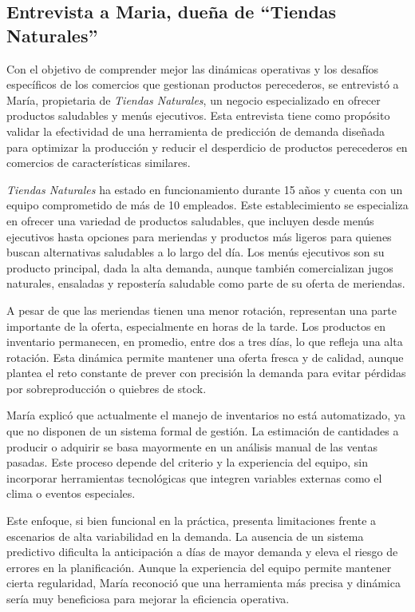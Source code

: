 \subsection{Entrevista a Maria, dueña de ``Tiendas Naturales''}

Con el objetivo de comprender mejor las dinámicas operativas y los desafíos específicos de los comercios que gestionan productos perecederos, se entrevistó a María, propietaria de \textit{Tiendas Naturales}, un negocio especializado en ofrecer productos saludables y menús ejecutivos. Esta entrevista tiene como propósito validar la efectividad de una herramienta de predicción de demanda diseñada para optimizar la producción y reducir el desperdicio de productos perecederos en comercios de características similares.

\indent \textit{Tiendas Naturales} ha estado en funcionamiento durante 15 años y cuenta con un equipo comprometido de más de 10 empleados. Este establecimiento se especializa en ofrecer una variedad de productos saludables, que incluyen desde menús ejecutivos hasta opciones para meriendas y productos más ligeros para quienes buscan alternativas saludables a lo largo del día. Los menús ejecutivos son su producto principal, dada la alta demanda, aunque también comercializan jugos naturales, ensaladas y repostería saludable como parte de su oferta de meriendas.

\indent A pesar de que las meriendas tienen una menor rotación, representan una parte importante de la oferta, especialmente en horas de la tarde. Los productos en inventario permanecen, en promedio, entre dos a tres días, lo que refleja una alta rotación. Esta dinámica permite mantener una oferta fresca y de calidad, aunque plantea el reto constante de prever con precisión la demanda para evitar pérdidas por sobreproducción o quiebres de stock.

\indent María explicó que actualmente el manejo de inventarios no está automatizado, ya que no disponen de un sistema formal de gestión. La estimación de cantidades a producir o adquirir se basa mayormente en un análisis manual de las ventas pasadas. Este proceso depende del criterio y la experiencia del equipo, sin incorporar herramientas tecnológicas que integren variables externas como el clima o eventos especiales.

\indent Este enfoque, si bien funcional en la práctica, presenta limitaciones frente a escenarios de alta variabilidad en la demanda. La ausencia de un sistema predictivo dificulta la anticipación a días de mayor demanda y eleva el riesgo de errores en la planificación. Aunque la experiencia del equipo permite mantener cierta regularidad, María reconoció que una herramienta más precisa y dinámica sería muy beneficiosa para mejorar la eficiencia operativa.


